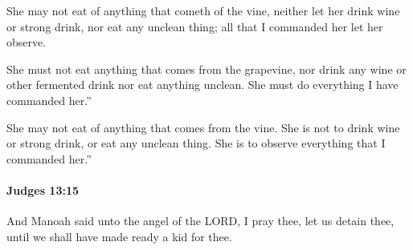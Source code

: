 			\begin{versebox}
					\item[BHS] 
					\item[ASV] She may not eat of anything that cometh of the vine, neither let her drink wine or strong drink, nor eat any unclean thing; all that I commanded her let her observe.
					\item[NIV] She must not eat anything that comes from the grapevine, nor drink any wine or other fermented drink nor eat anything unclean. She must do everything I have commanded her.”
					\item[NRSV] She may not eat of anything that comes from the vine. She is not to drink wine or strong drink, or eat any unclean thing. She is to observe everything that I commanded her.”
			\end{versebox}

		\paragraph{Judges 13:15} %
			\label{JUDGES-13-15}

			And Manoah said unto the angel of the LORD, I pray thee, let us detain thee, until we shall have made ready a kid for thee.

